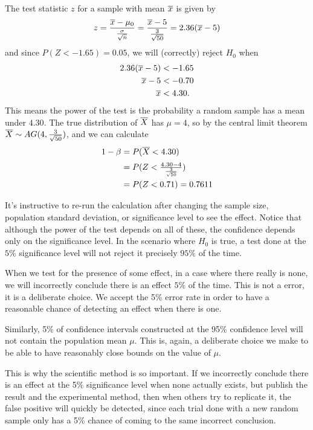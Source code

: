 \begin{example}
The test statistic $z$ for a sample with mean ${\overline{x}}$ is given by
$$z = \frac{{\overline{x}} - \mu_0}{\frac{\sigma}{\sqrt{n}}} = \frac{{\overline{x}} - 5}{\frac{3}{\sqrt{50}}}=2.36({\overline{x}} - 5)$$
and since $P(Z < -1.65) = 0.05$, we will (correctly) reject $H_0$ when
$$\begin{aligned}2.36({\overline{x}} - 5) &< -1.65 \\
{\overline{x}} - 5 &< -0.70 \\
{\overline{x}} &< 4.30.\end{aligned}$$
This means the power of the test is the probability a random sample has a mean under $4.30$. The true distribution of ${\overline{X}}$ has $\mu = 4$, so by the central limit theorem ${\overline{X}} \sim AG(4,\frac{3}{\sqrt{50}})$, and we can calculate
$$\begin{aligned}1-\beta &= P({\overline{X}} < 4.30) \\[0.5ex] &= P(Z < \textstyle\frac{4.30 - 4}{\frac{3}{\sqrt{50}}}) \\ &= P (Z < 0.71) = 0.7611\end{aligned}$$
\end{example}

It's instructive to re-run the calculation after changing the sample size, population standard deviation, or significance level to see the effect. Notice that although the power of the test depends on all of these, the confidence depends only on the significance level. In the scenario where $H_0$ is true, a test done at the $5\%$ significance level will not reject it precisely $95\%$ of the time.

\begin{keypoint}
When we test for the presence of some effect, in a case where there really is none, we will incorrectly conclude there is an effect $5\%$ of the time. This is not a error, it is a deliberate choice. We accept the 5\% error rate in order to have a reasonable chance of detecting an effect when there is one.

Similarly, 5\% of confidence intervals constructed at the 95\% confidence level will not contain the population mean $\mu$. This is, again, a deliberate choice we make to be able to have reasonably close bounds on the value of $\mu$.
\end{keypoint}

This is why the scientific method is so important. If we incorrectly conclude there is an effect at the 5\% significance level when none actually exists, but publish the result and the experimental method, then when others try to replicate it, the false positive will quickly be detected, since each trial done with a new random sample only has a 5\% chance of coming to the same incorrect conclusion.

